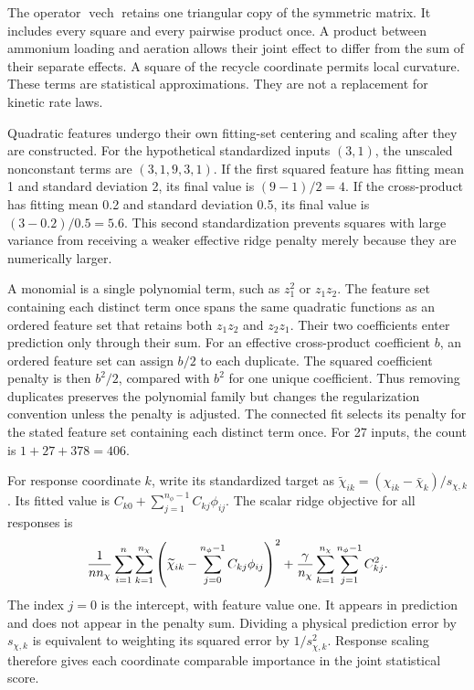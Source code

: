 The operator $\operatorname{vech}$ retains one triangular copy of the symmetric matrix. It includes every square and every pairwise product once. A product between ammonium loading and aeration allows their joint effect to differ from the sum of their separate effects. A square of the recycle coordinate permits local curvature. These terms are statistical approximations. They are not a replacement for kinetic rate laws.

Quadratic features undergo their own fitting-set centering and scaling after they are constructed. For the hypothetical standardized inputs $(3,1)$, the unscaled nonconstant terms are $(3,1,9,3,1)$. If the first squared feature has fitting mean 1 and standard deviation 2, its final value is $(9-1)/2=4$. If the cross-product has fitting mean 0.2 and standard deviation 0.5, its final value is $(3-0.2)/0.5=5.6$. This second standardization prevents squares with large variance from receiving a weaker effective ridge penalty merely because they are numerically larger.

A monomial is a single polynomial term, such as $z_1^2$ or $z_1z_2$. The feature set containing each distinct term once spans the same quadratic functions as an ordered feature set that retains both $z_1z_2$ and $z_2z_1$. Their two coefficients enter prediction only through their sum. For an effective cross-product coefficient $b$, an ordered feature set can assign $b/2$ to each duplicate. The squared coefficient penalty is then $b^2/2$, compared with $b^2$ for one unique coefficient. Thus removing duplicates preserves the polynomial family but changes the regularization convention unless the penalty is adjusted. The connected fit selects its penalty for the stated feature set containing each distinct term once. For 27 inputs, the count is $1+27+378=406$.

For response coordinate $k$, write its standardized target as $\widetilde\chi_{ik}=(\chi_{ik}-\bar\chi_k)/s_{\chi,k}$. Its fitted value is $C_{k0}+\sum_{j=1}^{n_\phi-1}C_{kj}\phi_{ij}$. The scalar ridge objective for all responses is
\begin{equation}
\equationname{Scalar expansion of the multiresponse ridge objective}
\frac1{n n_\chi}\sum_{i=1}^{n}\sum_{k=1}^{n_\chi}
\left(\widetilde\chi_{ik}-\sum_{j=0}^{n_\phi-1}C_{kj}\phi_{ij}\right)^2
+\frac{\gamma}{n_\chi}\sum_{k=1}^{n_\chi}\sum_{j=1}^{n_\phi-1}C_{kj}^2.
\end{equation}
The index $j=0$ is the intercept, with feature value one. It appears in prediction and does not appear in the penalty sum. Dividing a physical prediction error by $s_{\chi,k}$ is equivalent to weighting its squared error by $1/s_{\chi,k}^2$. Response scaling therefore gives each coordinate comparable importance in the joint statistical score.

